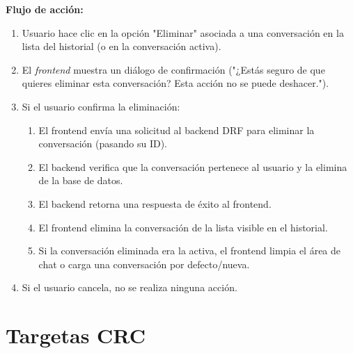 \begin{addendum}
\begin{userstory}[hu:07]
{			\textbf{Flujo de acción:}
			\begin{enumerate}
				\item Usuario hace clic en la opción "Eliminar" asociada a una conversación en la lista del historial (o en la conversación activa).
				\item El \textit{frontend} muestra un diálogo de confirmación ("¿Estás seguro de que quieres eliminar esta conversación? Esta acción no se puede deshacer.").
				\item Si el usuario confirma la eliminación:
				\begin{enumerate}
					\item El frontend envía una solicitud al backend DRF para eliminar la conversación (pasando su ID).
					\item El backend verifica que la conversación pertenece al usuario y la elimina de la base de datos.
					\item El backend retorna una respuesta de éxito al frontend.
					\item El frontend elimina la conversación de la lista visible en el historial.
					\item Si la conversación eliminada era la activa, el frontend limpia el área de chat o carga una conversación por defecto/nueva.
				\end{enumerate}
				\item Si el usuario cancela, no se realiza ninguna acción.
			\end{enumerate}
		}
		
	\end{userstory}
	
	
	\chapter{Targetas CRC}
		

\end{addendum}
